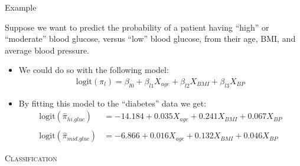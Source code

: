 \documentclass{beamer}\usepackage[]{graphicx}\usepackage[]{color}
\begin{document}

\begin{frame}[fragile]{Example}



Suppose we want to predict the probability of a patient having ``high'' or 
``moderate'' blood glucose, versus ``low'' blood glucose, from their age, BMI, 
and average blood pressure.
\vb
\begin{itemize}
\item We could do so with the following model:
  \begin{align*}
    \text{logit}(\pi_l) = 
    \beta_{l0} + \beta_{l1} X_{age} + \beta_{l2} X_{BMI} + \beta_{l3} X_{BP}
  \end{align*}
\item By fitting this model to the ``diabetes'' data we get:
  \begin{align*}
    \text{logit}(\hat{\pi}_{hi.gluc}) &= 
    -14.184 + 0.035 X_{age} + 0.241 X_{BMI} + 
    0.067 X_{BP}\\
    \\
    \text{logit}(\hat{\pi}_{mid.gluc}) &= 
    -6.866 + 0.016 X_{age} + 0.132 X_{BMI} + 
    0.046 X_{BP}
  \end{align*}
\end{itemize}

\end{frame}

  
\begin{frame}{}
  
  \begin{center}
    \Huge{\textsc{Classification}}
  \end{center}
  
\end{frame}
\end{document}
